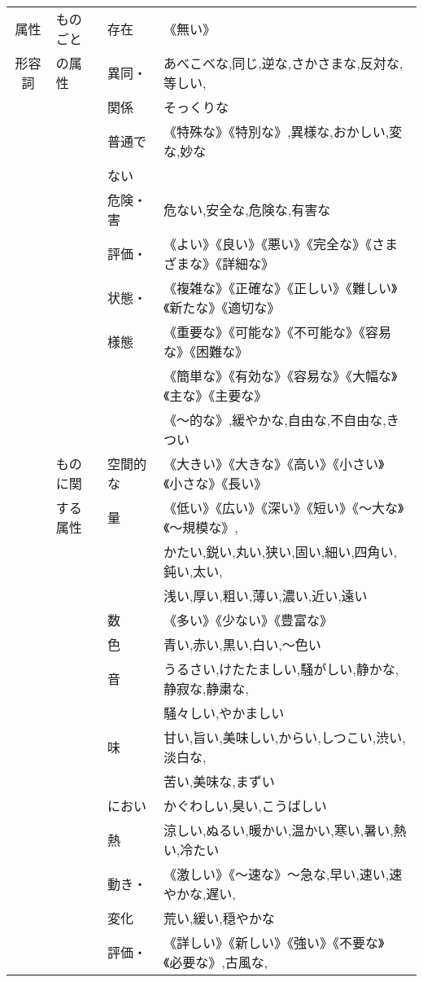{\begin{center}
\begin{tabular}{|c|l|l|l|}
属性   & ものごと& 存在 &
	《無い》 \\ \cline{3-4}
形容詞 & の属性  & 異同・ &
	あべこべな,同じ,逆な,さかさまな,反対な,等しい,\\
& & 関係 & 	そっくりな\\ \cline{3-4}
& & 普通で &
	《特殊な》《特別な》,異様な,おかしい,変な,妙な\\
& & ない & \\ \cline{3-4}
& & 危険・害 &
	危ない,安全な,危険な,有害な\\ \cline{3-4}
& & 評価・ &
	《よい》《良い》《悪い》《完全な》《さまざまな》《詳細な》\\
& & 状態・ &
	《複雑な》《正確な》《正しい》《難しい》《新たな》《適切な》\\
& & 様態 & 	
	《重要な》《可能な》《不可能な》《容易な》《困難な》\\
& & & 	《簡単な》《有効な》《容易な》《大幅な》《主な》《主要な》\\
& & & 	《〜的な》,緩やかな,自由な,不自由な,きつい\\ \cline{2-4}
& ものに関 & 空間的な &
	《大きい》《大きな》《高い》《小さい》《小さな》《長い》\\
& する属性 & 量 &
	《低い》《広い》《深い》《短い》《〜大な》《〜規模な》,\\
& & & 	かたい,鋭い,丸い,狭い,固い,細い,四角い,鈍い,太い,\\
& & & 	浅い,厚い,粗い,薄い,濃い,近い,遠い\\ \cline{3-4}
& & 数 &
	《多い》《少ない》《豊富な》\\ \cline{3-4}
& & 色 &
	青い,赤い,黒い,白い,〜色い\\ \cline{3-4}
& & 音 &
	うるさい,けたたましい,騒がしい,静かな,静寂な,静粛な,\\
& & & 	騒々しい,やかましい\\ \cline{3-4}
& & 味 &
	甘い,旨い,美味しい,からい,しつこい,渋い,淡白な,\\
& & & 	苦い,美味な,まずい\\ \cline{3-4}
& & におい &
	かぐわしい,臭い,こうばしい\\ \cline{3-4}
& & 熱 &
	涼しい,ぬるい,暖かい,温かい,寒い,暑い,熱い,冷たい\\ \cline{3-4}
& & 動き・ &
	《激しい》《〜速な》〜急な,早い,速い,速やかな,遅い,\\
& & 変化 & 荒い,緩い,穏やかな\\ \cline{3-4}
& & 評価・ &
	《詳しい》《新しい》《強い》《不要な》《必要な》,古風な,\\

\end{tabular}
\end{center}}
